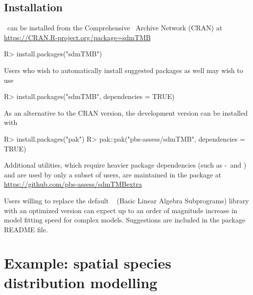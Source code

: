 \documentclass[article]{jss}\usepackage[]{graphicx}\usepackage[dvipsnames]{xcolor}
\newcommand{\sdmTMB}{\pkg{sdmTMB}}
\newcommand{\INLA}{\proglang{R}-\pkg{INLA}}
\newcommand{\R}{\proglang{R}}
\begin{document}
\subsection{Installation}\label{installation}

\sdmTMB\ can be installed from the Comprehensive \R\ Archive Network (CRAN) at\\
\url{https://CRAN.R-project.org/package=sdmTMB}

\begin{Schunk}
\begin{Sinput}
R> install.packages("sdmTMB")
\end{Sinput}
\end{Schunk}

Users who wish to automatically install suggested packages as well may wish to use

\begin{Schunk}
\begin{Sinput}
R> install.packages("sdmTMB", dependencies = TRUE)
\end{Sinput}
\end{Schunk}

As an alternative to the CRAN version, the development version can be installed with

\begin{Schunk}
\begin{Sinput}
R> install.packages("pak")
R> pak::pak("pbs-assess/sdmTMB", dependencies = TRUE)
\end{Sinput}
\end{Schunk}

Additional utilities, which require heavier package dependencies (such as \INLA\ and ) and are used by only a subset of users, are maintained in the  package at\\
\url{https://github.com/pbs-assess/sdmTMBextra}

Users willing to replace the default \R\  (Basic Linear Algebra Subprograms) \citep{blas}
library with an optimized version \citep[e.g., ;][]{openblas}
can expect up to an order of magnitude increase in model fitting speed for complex models.
Suggestions are included in the package README file.

\section{Example: spatial species distribution modelling}\label{pcod}
\end{document}
